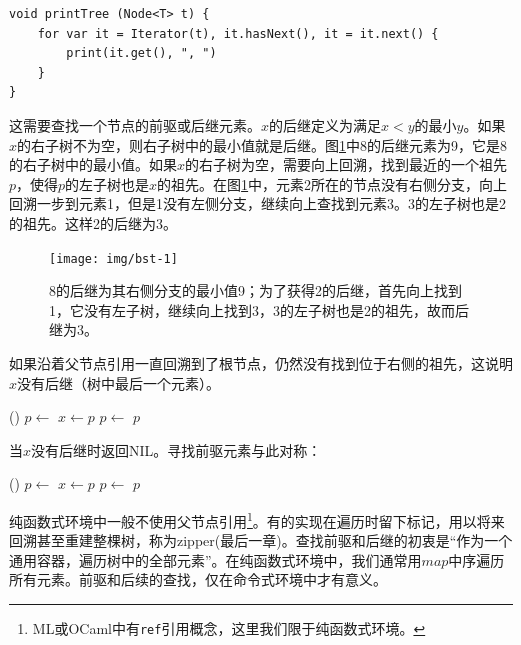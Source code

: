 \documentclass[b5paper]{ctexart}
\begin{document}
\lstset{language=Bourbaki}
\begin{lstlisting}
void printTree (Node<T> t) {
    for var it = Iterator(t), it.hasNext(), it = it.next() {
        print(it.get(), ", ")
    }
}
\end{lstlisting}

这需要查找一个节点的前驱或后继元素。$x$的后继定义为满足$x < y$的最小$y$。如果$x$的右子树不为空，则右子树中的最小值就是后继。图\ref{fig:bst-succ}中8的后继元素为9，它是8的右子树中的最小值。如果$x$的右子树为空，需要向上回溯，找到最近的一个祖先$p$，使得$p$的左子树也是$x$的祖先。在图\ref{fig:bst-succ}中，元素2所在的节点没有右侧分支，向上回溯一步到元素1，但是1没有左侧分支，继续向上查找到元素3。3的左子树也是2的祖先。这样2的后继为3。

\begin{figure}[htbp]
  \centering
  \texttt{[image: img/bst-1]}
  \caption{8的后继为其右侧分支的最小值9；为了获得2的后继，首先向上找到1，它没有左子树，继续向上找到3，3的左子树也是2的祖先，故而后继为3。} \label{fig:bst-succ}
\end{figure}

如果沿着父节点引用一直回溯到了根节点，仍然没有找到位于右侧的祖先，这说明$x$没有后继（树中最后一个元素）。

\begin{algorithmic}[1]
    \State \Return {}()
  \Else
    \State $p \gets $ 
      \State $x \gets p$
      \State $p \gets $ 
    \EndWhile
    \State \Return $p$
  \EndIf
\EndFunction
\end{algorithmic}

当$x$没有后继时返回NIL。寻找前驱元素与此对称：

\begin{algorithmic}[1]
    \State \Return {}()
  \Else
    \State $p \gets $ 
      \State $x \gets p$
      \State $p \gets $ 
    \EndWhile
    \State \Return $p$
  \EndIf
\EndFunction
\end{algorithmic}

纯函数式环境中一般不使用父节点引用\footnote{ML或OCaml中有\texttt{ref}引用概念，这里我们限于纯函数式环境。}。有的实现在遍历时留下标记，用以将来回溯甚至重建整棵树，称为zipper(\cite{learn-haskell}最后一章)。查找前驱和后继的初衷是“作为一个通用容器，遍历树中的全部元素”。在纯函数式环境中，我们通常用$map$中序遍历所有元素。前驱和后续的查找，仅在命令式环境中才有意义。
\end{document}
